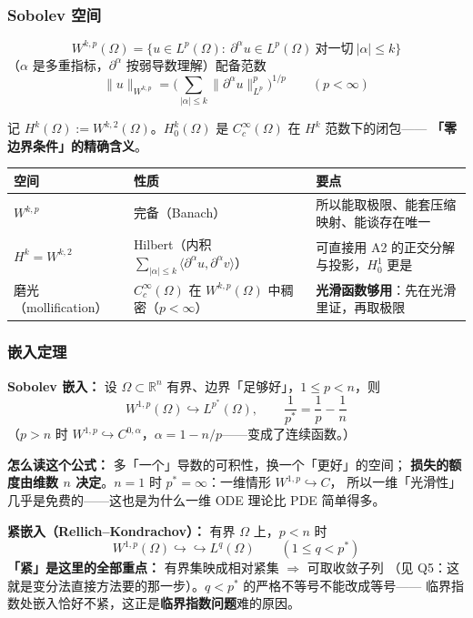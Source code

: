 \subsubsection{Sobolev 空间}

\[
W^{k,p}(\Omega)=\Big\{u\in L^p(\Omega):\ \partial^\alpha u\in L^p(\Omega)\ \text{对一切}\ |\alpha|\le k\Big\}
\]
（$\alpha$ 是多重指标，$\partial^\alpha$ 按弱导数理解）配备范数
\[
\|u\|_{W^{k,p}}=\Big(\sum_{|\alpha|\le k}\|\partial^\alpha u\|_{L^p}^p\Big)^{1/p}
\qquad(p<\infty)
\]

记 $H^k(\Omega):=W^{k,2}(\Omega)$。$H_0^k(\Omega)$ 是 $C_c^\infty(\Omega)$ 在 $H^k$ 范数下的闭包——
\textbf{「零边界条件」的精确含义}。

\begin{center}
\begin{tabular}{L{2.4cm}L{5.6cm}L{6.2cm}}
\toprule
\textbf{空间} & \textbf{性质} & \textbf{要点} \\
\midrule
$W^{k,p}$ & 完备（Banach） & 所以能取极限、能套压缩映射、能谈存在唯一 \\
$H^k=W^{k,2}$ & Hilbert（内积 $\sum_{|\alpha|\le k}\langle\partial^\alpha u,\partial^\alpha v\rangle$） &
可直接用 A2 的正交分解与投影，$H_0^1$ 更是 \\
磨光（mollification） & $C_c^\infty(\Omega)$ 在 $W^{k,p}(\Omega)$ 中稠密（$p<\infty$） &
\textbf{光滑函数够用}：先在光滑里证，再取极限 \\
\bottomrule
\end{tabular}
\end{center}

\subsubsection{嵌入定理}

\textbf{Sobolev 嵌入：} 设 $\Omega\subset\mathbb R^n$ 有界、边界「足够好」，$1\le p<n$，则
\[
W^{1,p}(\Omega)\hookrightarrow L^{p^*}(\Omega),\qquad
\frac1{p^*}=\frac1p-\frac1n
\]
（$p>n$ 时 $W^{1,p}\hookrightarrow C^{0,\alpha}$，$\alpha=1-n/p$——变成了连续函数。）

\textbf{怎么读这个公式：} 多「一个」导数的可积性，换一个「更好」的空间；
\textbf{损失的额度由维数 $n$ 决定}。$n=1$ 时 $p^*=\infty$：一维情形 $W^{1,p}\hookrightarrow C$，
所以一维「光滑性」几乎是免费的——这也是为什么一维 ODE 理论比 PDE 简单得多。

\textbf{紧嵌入（Rellich--Kondrachov）：} 有界 $\Omega$ 上，$p<n$ 时
\[
W^{1,p}(\Omega)\hookrightarrow\hookrightarrow L^q(\Omega)\qquad(\textstyle 1\le q<p^*)
\]
\textbf{「紧」是这里的全部重点：} 有界集映成相对紧集 $\Longrightarrow$ 可取收敛子列
（见 Q5：这就是变分法直接方法要的那一步）。$q<p^*$ 的严格不等号不能改成等号——
临界指数处嵌入恰好不紧，这正是\textbf{临界指数问题}难的原因。

